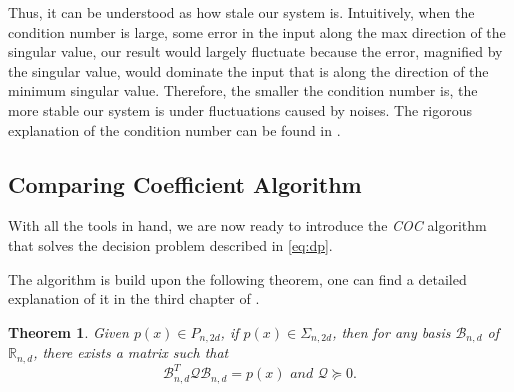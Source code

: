 \documentclass[12pt]{amsart}
\numberwithin{equation}{section}
\newtheorem{thm}{Theorem}
\theoremstyle{definition}
\numberwithin{thm}{section}
\begin{document}
Thus, it can be understood as how stale our system is. 
Intuitively, when the condition number is large, some error in the input along the max direction of the singular value,
our result would largely fluctuate because the error, magnified by the singular value, would dominate the input that is along
the direction of the minimum singular value. 
Therefore, the smaller the condition number is, the more stable our system is under fluctuations caused by noises.
The rigorous explanation of the condition number can be found in \cite{Cheney:Kincaid}.

\newpage

\subsection{Comparing Coefficient Algorithm}
With all the tools in hand, we are now ready to introduce the \emph{COC} algorithm that solves the 
decision problem described in \eqref{eq:dp}.

The algorithm is build upon the following theorem, one can find a detailed explanation of it in the third chapter of \cite{Blekherman:Parrilo:Thomas}.
\begin{thm}
     \label{thm:key}
     Given $p(x) \in P_{n, 2d}$, if $p(x) \in \Sigma_{n, 2d}$, then for any basis $\mathcal{B}_{n, d}$ of $\mathbb{R}_{n, d}$, 
     there exists a matrix such that
     \begin{equation}
          \mathcal{B}_{n, d} ^ T \mathcal{Q} \mathcal{B}_{n, d} = p(x) \textit{ and } \mathcal{Q} \succcurlyeq 0 \label{eq:2-4}.
     \end{equation}
\end{thm}
\end{document}
